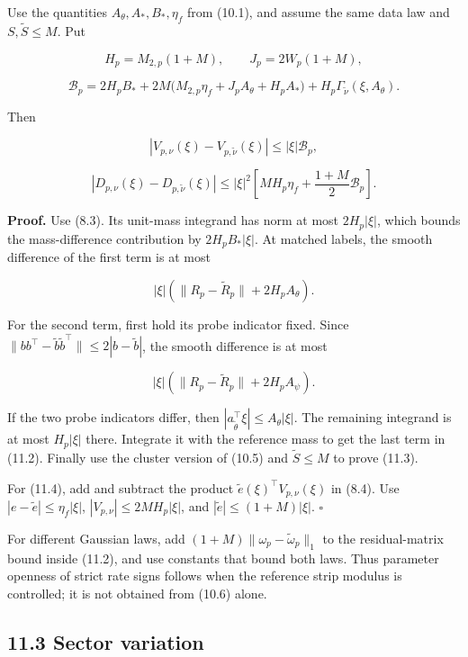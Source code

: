\documentclass[
  10pt,
]{article}
\begin{document}
Use the quantities \(A_\theta,A_*,B_*,\eta_f\) from (10.1), and assume
the same data law and \(S,\widetilde S\le M\). Put

\[
 H_p=M_{2,p}(1+M),\qquad J_p=2W_p(1+M),
\]

\[
 \mathcal B_p=2H_pB_*
 +2M\bigl(M_{2,p}\eta_f+J_pA_\theta+H_pA_*\bigr)
 +H_p\Gamma_{\widetilde\nu}(\xi,A_\theta).
 \tag{11.2}
\]

Then

\[
 |V_{p,\nu}(\xi)-V_{p,\widetilde\nu}(\xi)|
 \le |\xi|\mathcal B_p,
 \tag{11.3}
\]

\[
 \boxed{
 |D_{p,\nu}(\xi)-D_{p,\widetilde\nu}(\xi)|
 \le |\xi|^2\left[
 MH_p\eta_f+\frac{1+M}{2}\mathcal B_p\right].}
 \tag{11.4}
\]

\textbf{Proof.} Use (8.3). Its unit-mass integrand has norm at most
\(2H_p|\xi|\), which bounds the mass-difference contribution by
\(2H_pB_*|\xi|\). At matched labels, the smooth difference of the first
term is at most

\[
 |\xi|\left(\|R_p-\widetilde R_p\|+2H_pA_\theta\right).
\]

For the second term, first hold its probe indicator fixed. Since
\(\|bb^\top-\widetilde b\widetilde b^\top\|\le2|b-\widetilde b|\), the
smooth difference is at most

\[
 |\xi|\left(\|R_p-\widetilde R_p\|+2H_pA_\psi\right).
\]

If the two probe indicators differ, then
\(|a_{\widetilde\theta}^\top\xi|\le A_\theta|\xi|\). The remaining
integrand is at most \(H_p|\xi|\) there. Integrate it with the reference
mass to get the last term in (11.2). Finally use the cluster version of
(10.5) and \(\widetilde S\le M\) to prove (11.3).

For (11.4), add and subtract the product
\(\widetilde e(\xi)^\top V_{p,\nu}(\xi)\) in (8.4). Use
\(|e-\widetilde e|\le\eta_f|\xi|\), \(|V_{p,\nu}|\le2MH_p|\xi|\), and
\(|\widetilde e|\le(1+M)|\xi|\). \(\square\)

For different Gaussian laws, add
\((1+M)\|\omega_p-\widetilde\omega_p\|_1\) to the residual-matrix bound
inside (11.2), and use constants that bound both laws. Thus parameter
openness of strict rate signs follows when the reference strip modulus
is controlled; it is not obtained from (10.6) alone.

\subsection{11.3 Sector variation}\label{sector-variation}
\end{document}
